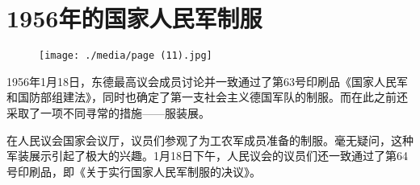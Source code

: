 \section{1956年的国家人民军制服}

\begin{figure}
\texttt{[image: ./media/page (11).jpg]}
\end{figure}

1956年1月18日，东德最高议会成员讨论并一致通过了第63号印刷品《国家人民军和国防部组建法》，同时也确定了第一支社会主义德国军队的制服。而在此之前还采取了一项不同寻常的措施——服装展。

在人民议会国家会议厅，议员们参观了为工农军成员准备的制服。毫无疑问，这种军装展示引起了极大的兴趣。1月18日下午，人民议会的议员们还一致通过了第64号印刷品，即《关于实行国家人民军制服的决议》。

